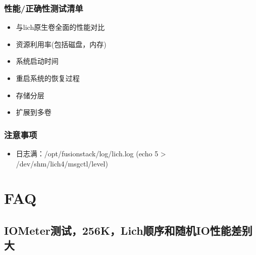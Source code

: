 \documentclass[UTF8]{ctexart}
\begin{document}
\subsubsection{性能/正确性测试清单}

\begin{itemize}
    \item 与lich原生卷全面的性能对比
    \item 资源利用率(包括磁盘，内存)
    \item 系统启动时间
    \item 重启系统的恢复过程
    \item 存储分层
    \item 扩展到多卷
\end{itemize}

\subsubsection{注意事项}

\begin{itemize}
    \item 日志满：/opt/fusionstack/log/lich.log (echo 5 > /dev/shm/lich4/msgctl/level)
\end{itemize}


\section{FAQ}

\subsection{IOMeter测试，256K，Lich顺序和随机IO性能差别大}
\end{document}
